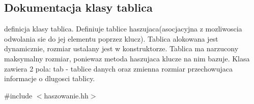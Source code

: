 \hypertarget{classtablica}{}\subsection{Dokumentacja klasy tablica}
\label{classtablica}


definicja klasy tablica. Definiuje tablice haszujaca(asocjacyjna z mozliwoscia odwolania sie do jej elementu poprzez klucz). Tablica alokowana jest dynamicznie, rozmiar ustalany jest w konstruktorze. Tablica ma narzucony maksymalny rozmiar, poniewaz metoda haszujaca klucze na nim bazuje. Klasa zawiera 2 pola\+: tab -\/ tablice danych oraz zmienna rozmiar przechowujaca informacje o dlugosci tablicy.  




{\ttfamily \#include $<$haszowanie.\+hh$>$}

